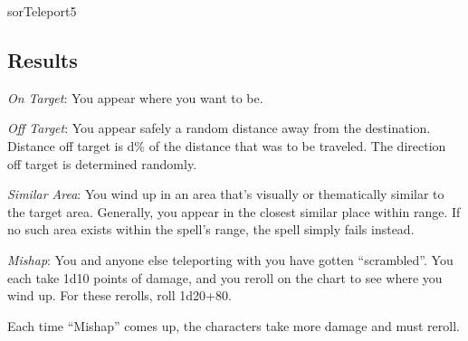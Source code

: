 \begin{spellcard}{sor}{Teleport}{5}
  \subsection*{Results}
  \emph{On Target}: You appear where you want to be.

  \emph{Off Target}: You appear safely a random distance away from the destination.
  Distance off target is d\% of the distance that was to be traveled.
  The direction off target is determined randomly.

  \emph{Similar Area}: You wind up in an area that's visually or thematically similar to the target area.
  Generally, you appear in the closest similar place within range.
  If no such area exists within the spell's range, the spell simply fails instead.

  \emph{Mishap}: You and anyone else teleporting with you have gotten ``scrambled''.
  You each take 1d10 points of damage, and you reroll on the chart to see where you wind up.
  For these rerolls, roll 1d20+80.

  Each time ``Mishap'' comes up, the characters take more damage and must reroll.

\end{spellcard}
